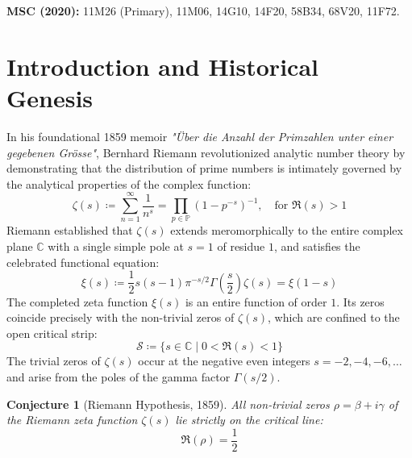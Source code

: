 \documentclass[11pt,a4paper]{article}
\newtheorem{conjecture}[theorem]{Conjecture}
\theoremstyle{definition}
\begin{document}
\noindent\textbf{MSC (2020):} 11M26 (Primary), 11M06, 14G10, 14F20, 58B34, 68V20, 11F72.

\newpage
\tableofcontents
\newpage

\section{Introduction and Historical Genesis}
In his foundational 1859 memoir \emph{"Über die Anzahl der Primzahlen unter einer gegebenen Grösse"}, Bernhard Riemann \cite{riemann1859} revolutionized analytic number theory by demonstrating that the distribution of prime numbers is intimately governed by the analytical properties of the complex function:
\begin{equation}\label{eq:zeta_def}
\zeta(s) \coloneqq \sum_{n=1}^\infty \frac{1}{n^s} = \prod_{p \in \mathbb{P}} \left( 1 - p^{-s} \right)^{-1}, \quad \text{for } \Re(s) > 1
\end{equation}
Riemann established that $\zeta(s)$ extends meromorphically to the entire complex plane $\mathbb{C}$ with a single simple pole at $s = 1$ of residue $1$, and satisfies the celebrated functional equation:
\begin{equation}\label{eq:functional_eq}
\xi(s) \coloneqq \frac{1}{2} s(s - 1) \pi^{-s/2} \Gamma\left(\frac{s}{2}\right) \zeta(s) = \xi(1 - s)
\end{equation}
The completed zeta function $\xi(s)$ is an entire function of order $1$. Its zeros coincide precisely with the non-trivial zeros of $\zeta(s)$, which are confined to the open critical strip:
\begin{equation}
\mathcal{S} \coloneqq \{ s \in \mathbb{C} \mid 0 < \Re(s) < 1 \}
\end{equation}
The trivial zeros of $\zeta(s)$ occur at the negative even integers $s = -2, -4, -6, \dots$ and arise from the poles of the gamma factor $\Gamma(s/2)$.

\begin{conjecture}[Riemann Hypothesis, 1859]\label{conj:rh}
All non-trivial zeros $\rho = \beta + i\gamma$ of the Riemann zeta function $\zeta(s)$ lie strictly on the critical line:
\begin{equation}
\Re(\rho) = \frac{1}{2}
\end{equation}
\end{conjecture}
\end{document}
